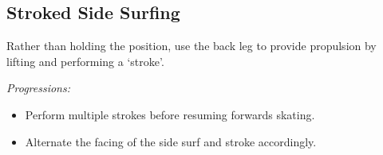 \subsection*{Stroked Side Surfing}
\label{drill:side_surf/stroked}

Rather than holding the position, use the back leg to provide propulsion by lifting and performing a `stroke'.    

{\it Progressions:}
\begin{itemize}
\item Perform multiple strokes before resuming forwards skating.  
\item Alternate the facing of the side surf and stroke accordingly. 
\end{itemize}


